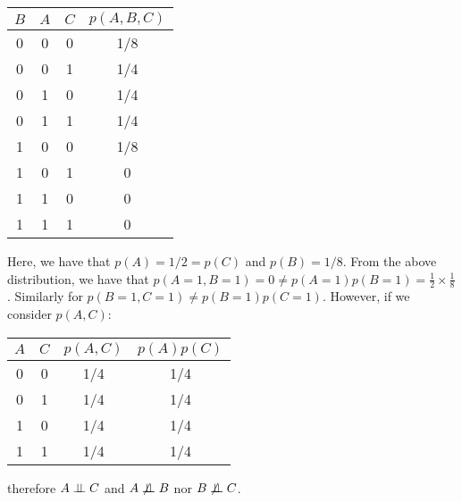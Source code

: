 \tffalse

\begin{tabular}{c|c|c|c}
    $B$ & $A$ & $C$ & $p(A,B,C)$\\
    \hline
    0 & 0 & 0 & 1/8\\
    0 & 0 & 1 & 1/4\\
    0 & 1 & 0 & 1/4\\
    0 & 1 & 1 & 1/4\\
    1 & 0 & 0 & 1/8\\
    1 & 0 & 1 & 0\\
    1 & 1 & 0 & 0\\
    1 & 1 & 1 & 0\\
\end{tabular}

Here, we have that $p(A) = 1/2 = p(C)$ and $p(B) = 1/8$. From the above distribution, we have that $p(A = 1, B = 1) = 0 \neq p(A = 1) p(B = 1) = \frac{1}{2} \times\frac{1}{8}$. Similarly for $p(B = 1, C = 1) \neq p(B = 1)p(C = 1)$. However, if we consider $p(A, C)$:

\begin{tabular}{c|c|c|c}
    $A$ & $C$ & $p(A, C)$ & $p(A) p(C)$\\
    \hline
    0 & 0 & 1/4 & 1/4 \\
    0 & 1 & 1/4 & 1/4 \\
    1 & 0 & 1/4 & 1/4 \\
    1 & 1 & 1/4 & 1/4
\end{tabular}

therefore $ A \perp\!\!\!\perp C $ and $ A \not\perp\!\!\!\perp B$ nor $ B \not\perp\!\!\!\perp C$.